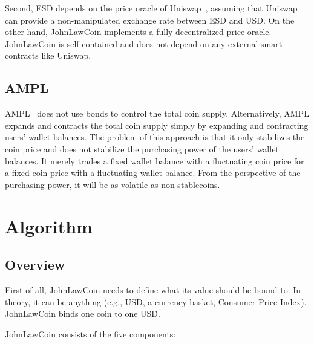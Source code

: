 \documentclass[dvipdfmx,a4paper]{article}
\begin{document}
Second, ESD depends on the price oracle of Uniswap~\cite{uniswap}, assuming that Uniswap can provide a non-manipulated exchange rate between ESD and USD. On the other hand, JohnLawCoin implements a fully decentralized price oracle. JohnLawCoin is self-contained and does not depend on any external smart contracts like Uniswap.

\subsection{AMPL}

AMPL~\cite{ampl} does not use bonds to control the total coin supply. Alternatively, AMPL expands and contracts the total coin supply simply by expanding and contracting users' wallet balances. The problem of this approach is that it only stabilizes the coin price and does not stabilize the purchasing power of the users' wallet balances. It merely trades a fixed wallet balance with a fluctuating coin price for a fixed coin price with a fluctuating wallet balance. From the perspective of the purchasing power, it will be as volatile as non-stablecoins.

\section{Algorithm}

\subsection{Overview}

First of all, JohnLawCoin needs to define what its value should be bound to. In theory, it can be anything (e.g., USD, a currency basket, Consumer Price Index). JohnLawCoin binds one coin to one USD.

JohnLawCoin consists of the five components:
\end{document}
